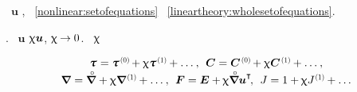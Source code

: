 \vspace{-0.1em}\noindent
{} ~$\bm{u}$ ,  ~\eqref{nonlinear:setofequations} ~\eqref{lineartheory:wholesetofequations}.

.
~$\bm{u}$     $\upchi \bm{u}$, ${\upchi \hspace{-0.1ex}\to 0}$.
    ~$\upchi$

\nopagebreak\vspace{-0.1em}\begin{equation*}
\begin{array}{c}
\cauchystress \hspace{.1ex} = \cauchystress^{\hspace{.2ex}\scalebox{0.66}{(0)}} \hspace{-0.2ex} + \smallparameter \cauchystress^{\hspace{.2ex}\scalebox{0.66}{(1)}} \hspace{-0.1ex} + \ldots \hspace{.1ex},
\:\:
\bm{C} = \bm{C}^{\hspace{.2ex}\scalebox{0.66}{(0)}} \hspace{-0.2ex} + \smallparameter \bm{C}^{\hspace{.2ex}\scalebox{0.66}{(1)}} \hspace{-0.1ex} + \ldots \hspace{.1ex} ,
\\[.1em]
%
\boldnabla \hspace{.1ex} = \boldnablacircled \hspace{.1ex} + \smallparameter \boldnabla^{\hspace{.2ex}\scalebox{0.66}{(1)}} \hspace{-0.1ex} + \ldots \hspace{.1ex} , \:\:
\bm{F} = \UnitDyad + \hspace{-0.1ex} \smallparameter \boldnablacircled {\bm{u}}^{\T} \hspace{-0.3ex},
\:\:
J = 1 + \hspace{-0.1ex} \smallparameter J^{\hspace{.1ex}\scalebox{0.66}{(1)}} \hspace{-0.1ex} + \ldots
\end{array}
\end{equation*}

